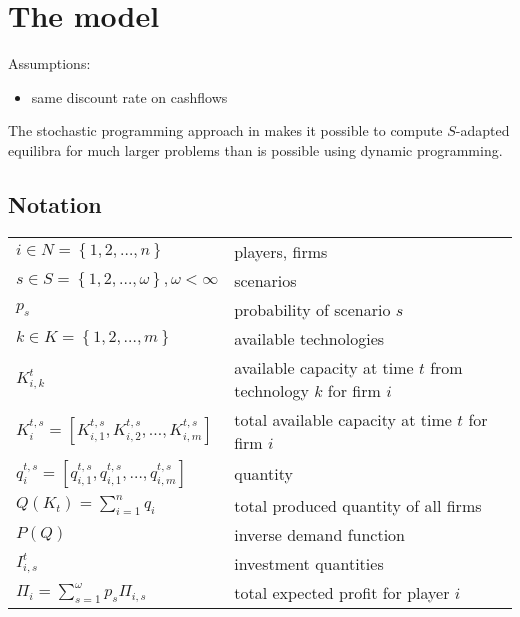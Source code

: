 \section{The model}

Assumptions:

\begin{itemize}
	\item same discount rate on cashflows
\end{itemize}

The stochastic programming approach in \cite{Genc2007} makes it possible to compute $S$-adapted equilibra for much larger problems than is possible using dynamic programming.

\subsection{Notation}

\begin{longtable}[c]{l l}
$i\in N=\left\{ 1,2,\dots,n\right\}$                           & players, firms\\
$s\in S=\left\{ 1,2,\dots,\omega\right\}, \omega<\infty$       & scenarios\\
$p_s$                                                          & probability of scenario $s$\\
$k\in K=\left\{ 1,2,\dots,m\right\}$                           & available technologies\\
$K_{i,k}^t$                                                     & available capacity at time $t$ from technology $k$ for firm $i$\\
$K_i^{t,s}=\left[K_{i,1}^{t,s},K_{i,2}^{t,s},\dots,K_{i,m}^{t,s}\right]$                                    & total available capacity at time $t$ for firm $i$\\

$q_{i}^{t,s}=\left[q_{i,1}^{t,s}, q_{i,1}^{t,s}, \dots, q_{i,m}^{t,s}\right]$                                                     & quantity\\
$Q(K_t)=\sum_{i=1}^nq_i$                                        & total produced quantity of all firms\\
$P(Q)$                                                         & inverse demand function\\
$I_{i,s}^t$                                                     & investment quantities\\
$\Pi_i=\sum_{s=1}^\omega p_s\Pi_{i,s}$                            & total expected profit for player $i$
\end{longtable}



